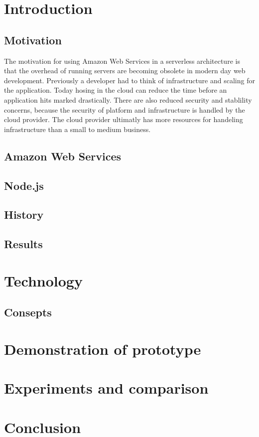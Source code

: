 \documentclass[12pt]{article}
\begin{document}


\setcounter{page}{0}


\section{Introduction}
\subsection{Motivation}
The motivation for using Amazon Web Services in a serverless architecture is that the overhead of running servers are becoming obsolete in modern day web development.
Previously a developer had to think of infrastructure and scaling for the application. Today hosing in the cloud can reduce the time before an application hits marked drastically. There are also reduced security and stablility concerns, because the security of platform and infrastructure is handled by the cloud provider. The cloud provider ultimatly has more resources for handeling infrastructure than a small to medium business.
\subsection{Amazon Web Services}
\subsection{Node.js}
\subsection{History}
\subsection{Results}

\section{Technology}

\subsection{Consepts}
\section{Demonstration of prototype}
\section{Experiments and comparison}
\section{Conclusion}


\clearpage


\end{document}

